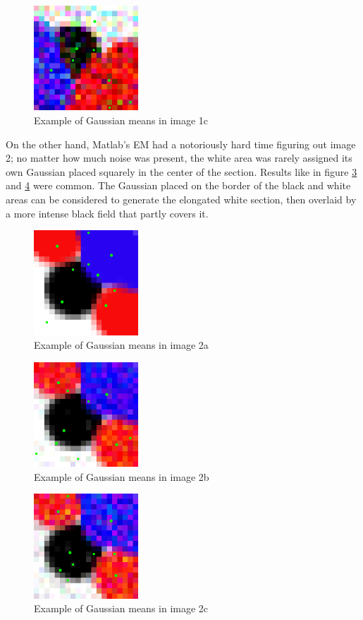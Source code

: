 \documentclass[letterpaper, 10pt, twocolumn]{article}
\numberwithin{theorem}{section}
\begin{document}
\begin{figure}[h]
	\centering
	\includegraphics[width=0.35\textwidth]{1c-means}
	\caption{Example of Gaussian means in image 1c}
	\label{fig:1c-means}
\end{figure}

On the other hand, Matlab's EM had a notoriously hard time figuring out image 2; no matter how much noise was present, the white area was rarely assigned its own Gaussian placed squarely in the center of the section.
Results like in figure \ref{fig:2b-means} and \ref{fig:2c-means} were common.
The Gaussian placed on the border of the black and white areas can be considered to generate the elongated white section, then overlaid by a more intense black field that partly covers it.

\begin{figure}[h]
	\centering
	\includegraphics[width=0.35\textwidth]{2a-means}
	\caption{Example of Gaussian means in image 2a}
	\label{fig:2a-means}
\end{figure}

\begin{figure}[h]
	\centering
	\includegraphics[width=0.35\textwidth]{2b-means}
	\caption{Example of Gaussian means in image 2b}
	\label{fig:2b-means}
\end{figure}

\begin{figure}[h]
	\centering
	\includegraphics[width=0.35\textwidth]{2c-means}
	\caption{Example of Gaussian means in image 2c}
	\label{fig:2c-means}
\end{figure}



\clearpage

\end{document}
